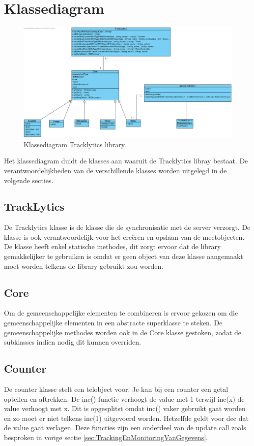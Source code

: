 \section{Klassediagram} \label{sec:Klassediagram}
\begin{figure}[!h]
  \centering
  \includegraphics[scale=0.4]{Afbeeldingen/Implementatie/ClassDiagram}
  \caption{Klassediagram Tracklytics library.}
  \label{fig:fig}
\end{figure}

Het klassediagram duidt de klasses aan waaruit de Tracklytics libray bestaat. De verantwoordelijkheden van de verschillende klasses worden uitgelegd in de volgende secties.

\subsection{TrackLytics}
De Tracklytics klasse is de klasse die de synchronisatie met de server verzorgt. De klasse is ook verantwoordelijk voor het creëren en opslaan van de meetobjecten. De klasse heeft enkel statische methodes, dit zorgt ervoor dat de library gemakkelijker te gebruiken is omdat er geen object van deze klasse aangemaakt moet worden telkens de library gebruikt zou worden.

\subsection{Core}
Om de gemeenschappelijke elementen te combineren is ervoor gekozen om die gemeenschappelijke elementen in een abstracte superklasse te steken. De gemeenschappelijke methodes worden ook in de Core klasse gestoken, zodat de subklasses indien nodig dit kunnen overriden. 

\subsection{Counter}
De counter klasse stelt een telobject voor. Je kan bij een counter een getal optellen en aftrekken. De inc() functie verhoogt de value met 1 terwijl inc(x) de value verhoogt met x. Dit is opgesplitst omdat inc() vaker gebruikt gaat worden en zo moet er niet telkens inc(1) uitgevoerd worden. Hetzelfde geldt voor dec dat de value gaat verlagen. Deze functies zijn een onderdeel van de update call zoals besproken in vorige sectie \ref{sec:TrackingEnMonitoringVanGegevens}.

